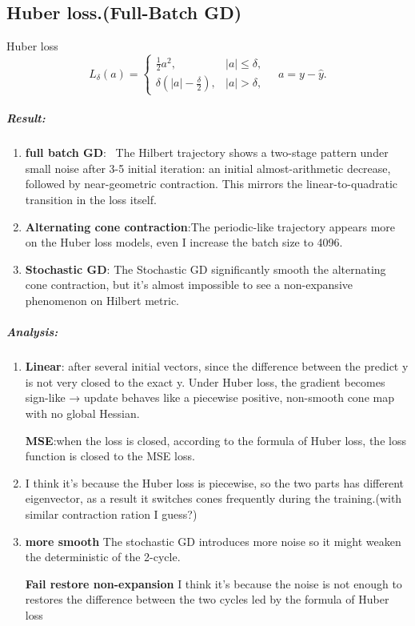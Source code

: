 \documentclass[11pt]{article}
\begin{document}
\subsection{Huber loss.(Full-Batch GD)}
Huber loss
\[
L_\delta(a)=
\begin{cases}
\frac{1}{2}a^2, & |a|\le\delta,\\[3pt]
\delta(|a|-\frac{\delta}{2}), & |a|>\delta,
\end{cases} \quad  a = y - \hat{y}.
\]
\subparagraph{\textbf{Result:}}
\begin{enumerate}
    \item \textbf{full batch GD}: \ The Hilbert trajectory shows a two-stage pattern under small noise after 3-5 initial iteration: an initial
almost-arithmetic decrease, followed by near-geometric contraction.  This mirrors the linear-to-quadratic transition in the loss itself.
    \item \textbf{Alternating cone contraction}:The periodic-like trajectory appears more on the Huber loss models, even I increase the batch size to 4096.
    \item \textbf{Stochastic GD}: The Stochastic GD significantly smooth the alternating cone contraction, but it's almost impossible to see a non-expansive phenomenon on Hilbert metric.
\end{enumerate}
\subparagraph{\textbf{Analysis:}}
\begin{enumerate}
    \item \textbf{Linear}: after several initial vectors, since the difference between the predict y is not very closed to the exact y. Under Huber loss, the gradient becomes sign-like → update behaves like a piecewise positive, non-smooth cone map with no global Hessian.

    \textbf{MSE}:when the loss is closed, according to the formula of Huber loss, the loss function is closed to the MSE loss.
    \item I think it's because the Huber loss is piecewise, so the two parts has different eigenvector, as a result it switches cones frequently during the training.(with similar contraction ration I guess?)
    \item \textbf{more smooth} The stochastic GD introduces more noise so it might weaken the deterministic of the 2-cycle.

    \textbf{Fail restore non-expansion} I think it's because the noise is not enough to restores the difference between the two cycles led by the formula of Huber loss
\end{enumerate}
\end{document}

